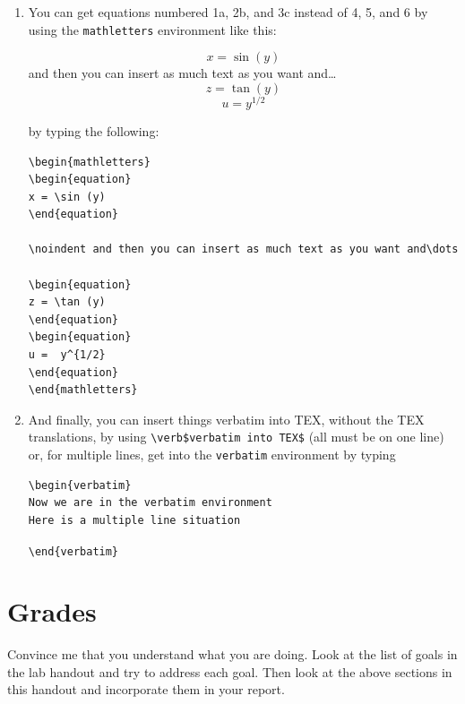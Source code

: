 \documentclass[12pt,preprint]{aastex}
\begin{document}
\begin{enumerate}
\item You can get equations numbered 1a, 2b, and 3c instead of 4, 5,
and 6 by using the \verb$mathletters$ environment like this:
\begin{mathletters}
\begin{equation}
x = \sin (y)
\end{equation}
\noindent and then you can insert as much text as you want and\dots
\begin{equation}
z = \tan (y)
\end{equation}
\begin{equation}
u =  y^{1/2}
\end{equation}
\end{mathletters}
by typing the following:
\begin{verbatim}
\begin{mathletters}
\begin{equation}
x = \sin (y)
\end{equation}

\noindent and then you can insert as much text as you want and\dots

\begin{equation}
z = \tan (y)
\end{equation}
\begin{equation}
u =  y^{1/2}
\end{equation}
\end{mathletters}
\end{verbatim}

\item And finally, you can insert things verbatim into TEX, without the
TEX translations, by using \verb=\verb$verbatim into TEX$= (all must be
on one line) or, for multiple lines, get into the \verb$verbatim$
environment by typing

\begin{verbatim}
\begin{verbatim}
Now we are in the verbatim environment
Here is a multiple line situation
\end{verbatim}
\verb$\end{verbatim}$
\end{enumerate}

\section{Grades}

\noindent
 Convince me that you understand
 what you are doing.  Look at the list of goals in the lab handout and try to address each goal. Then look at the above sections in this
 handout and incorporate them in your report.
\end{document}

